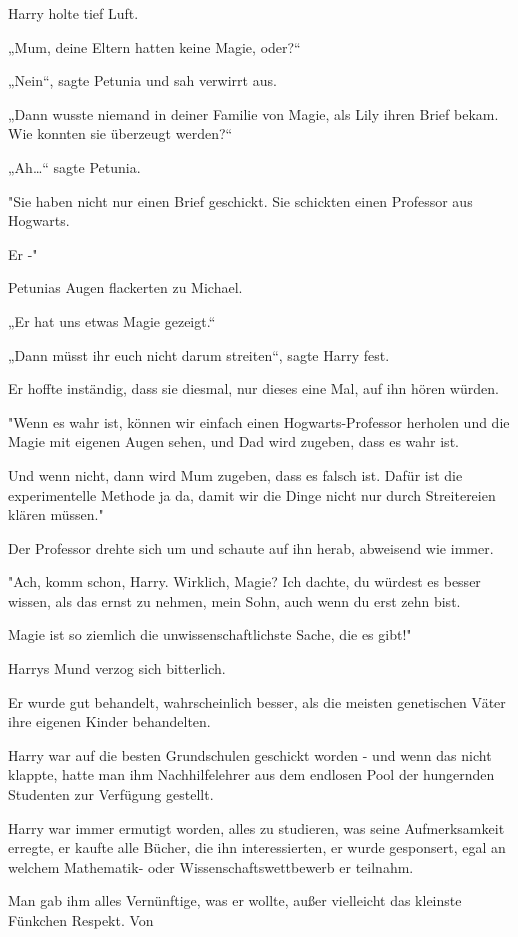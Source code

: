 {Harry holte tief Luft.

„Mum, deine Eltern hatten keine Magie, oder?“

„Nein“, sagte Petunia und sah verwirrt aus.

„Dann wusste niemand in deiner Familie von Magie, als Lily ihren Brief bekam. Wie konnten sie überzeugt werden?“

„Ah…“ sagte Petunia.

"Sie haben nicht nur einen Brief geschickt. Sie schickten einen Professor aus Hogwarts.

Er -"

Petunias Augen flackerten zu Michael.

„Er hat uns etwas Magie gezeigt.“

„Dann müsst ihr euch nicht darum streiten“, sagte Harry fest.

Er hoffte inständig, dass sie diesmal, nur dieses eine Mal, auf ihn hören würden.

"Wenn es wahr ist, können wir einfach einen Hogwarts-Professor herholen und die Magie mit eigenen Augen sehen, und Dad wird zugeben, dass es wahr ist.

Und wenn nicht, dann wird Mum zugeben, dass es falsch ist. Dafür ist die experimentelle Methode ja da, damit wir die Dinge nicht nur durch Streitereien klären müssen."

Der Professor drehte sich um und schaute auf ihn herab, abweisend wie immer.

"Ach, komm schon, Harry. Wirklich, Magie? Ich dachte, du würdest es besser wissen, als das ernst zu nehmen, mein Sohn, auch wenn du erst zehn bist.

Magie ist so ziemlich die unwissenschaftlichste Sache, die es gibt!"

Harrys Mund verzog sich bitterlich.

Er wurde gut behandelt, wahrscheinlich besser, als die meisten genetischen Väter ihre eigenen Kinder behandelten.

Harry war auf die besten Grundschulen geschickt worden - und wenn das nicht klappte, hatte man ihm Nachhilfelehrer aus dem endlosen Pool der hungernden Studenten zur Verfügung gestellt.

Harry war immer ermutigt worden, alles zu studieren, was seine Aufmerksamkeit erregte, er kaufte alle Bücher, die ihn interessierten, er wurde gesponsert, egal an welchem Mathematik- oder Wissenschaftswettbewerb er teilnahm.

Man gab ihm alles Vernünftige, was er wollte, außer vielleicht das kleinste Fünkchen Respekt. Von

}

